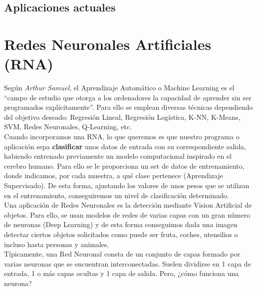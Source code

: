 \subsection{Aplicaciones actuales}
\label{subsec:aplicaciones_actuales}



\section{Redes Neuronales Artificiales (RNA)}
\label{sec:redes_neuronales}

Según \emph{Arthur Samuel}, el Aprendizaje Automático o Machine Learning es el ``campo de estudio que otorga a los ordenadores la capacidad de aprender sin ser programados explícitamente''. Para ello se emplean diversas técnicas dependiendo del objetivo deseado: Regresión Lineal, Regresión Logística, K-NN, K-Means, SVM, Redes Neuronales, Q-Learning, etc.
\\

Cuando incorporamos una RNA, lo que queremos es que nuestro programa o aplicación sepa \textbf{clasificar} unos datos de entrada con su correspondiente salida, habiendo entrenado previamente un modelo computacional inspirado en el cerebro humano. Para ello se le proporciona un set de datos de entrenamiento, donde indicamos, por cada muestra, a qué clase pertenece (Aprendizaje Supervisado). De esta forma, ajustando los valores de unos pesos que se utilizan en el entrenamiento, conseguiremos un nivel de clasificación determinado.\\

Una aplicación de Redes Neuronales es la detección mediante Vision Artificial de objetos. Para ello, se usan modelos de redes de varias capas con un gran número de neuronas (Deep Learning) y de esta forma conseguimos dada una imagen detectar ciertos objetos solicitados como puede ser fruta, coches, utensilios o incluso hasta personas y animales.\\

Típicamente, una Red Neuronal consta de un conjunto de capas formado por varias neuronas que se encuentran interconectadas. Suelen dividirse en 1 capa de entrada, 1 o más capas ocultas y 1 capa de salida. Pero, ¿cómo funciona una neurona?\\

